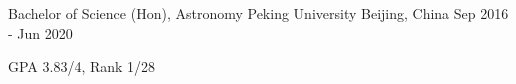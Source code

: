 


\begin{cventries}


\cventry
{{Bachelor of Science (Hon)}, Astronomy} %
{Peking University} %
{Beijing, China} %
{Sep 2016 - Jun 2020} %
{ %
	\begin{cvitems}
		\item {GPA 3.83/4, Rank 1/28}
	\end{cvitems}
}




\end{cventries}